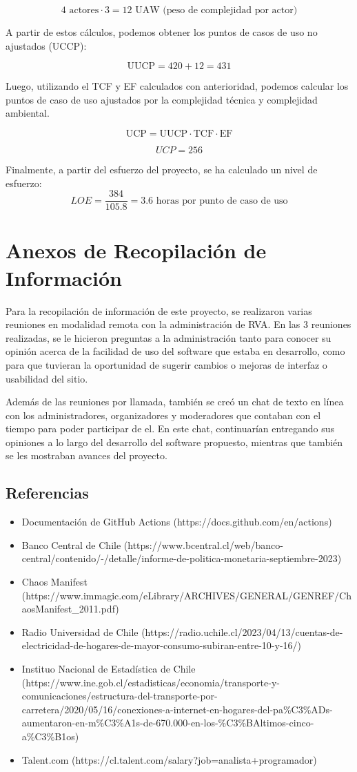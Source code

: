 \[
 4 \text{ actores} \cdot 3 = 12 \text{ UAW} \text{ (peso de complejidad por actor)}
\]

A partir de estos cálculos, podemos obtener los puntos de casos de uso no ajustados (UCCP):

\[
\text{UUCP} = 420 + 12 = 431
\]

Luego, utilizando el TCF y EF calculados con anterioridad, podemos calcular los puntos de caso de uso ajustados por la complejidad técnica y complejidad ambiental.

\[
\text{UCP} = \text{UUCP} \cdot \text{TCF} \cdot \text{EF}
\]

\[
UCP = 256
\]


Finalmente, a partir del esfuerzo del proyecto, se ha calculado un nivel de esfuerzo:
\[
LOE = \frac{384}{105.8} = 3.6 \text{ horas por punto de caso de uso}
\]

\section{Anexos de Recopilación de Información}
Para la recopilación de información de este proyecto, se realizaron varias reuniones en modalidad remota con la administración de RVA. En las 3 reuniones realizadas, se le hicieron preguntas a la administración tanto para conocer su opinión acerca de la facilidad de uso del software que estaba en desarrollo, como para que tuvieran la oportunidad de sugerir cambios o mejoras de interfaz o usabilidad del sitio.

Además de las reuniones por llamada, también se creó un chat de texto en línea con los administradores, organizadores y moderadores que contaban con el tiempo para poder participar de el. En este chat, continuarían entregando sus opiniones a lo largo del desarrollo del software propuesto, mientras que también se les mostraban avances del proyecto.

\subsection{Referencias}
\begin{itemize}
  \item Documentación de GitHub Actions (https://docs.github.com/en/actions)
  \item Banco Central de Chile (https://www.bcentral.cl/web/banco-central/contenido/-/detalle/informe-de-politica-monetaria-septiembre-2023)
  \item Chaos Manifest (https://www.immagic.com/eLibrary/ARCHIVES/GENERAL/GENREF/ChaosManifest\_2011.pdf)
  \item Radio Universidad de Chile (https://radio.uchile.cl/2023/04/13/cuentas-de-electricidad-de-hogares-de-mayor-consumo-subiran-entre-10-y-16/)
  \item Instituo Nacional de Estadística de Chile (https://www.ine.gob.cl/estadisticas/economia/transporte-y-comunicaciones/estructura-del-transporte-por-carretera/2020/05/16/conexiones-a-internet-en-hogares-del-pa\%C3\%ADs-aumentaron-en-m\%C3\%A1s-de-670.000-en-los-\%C3\%BAltimos-cinco-a\%C3\%B1os)
  \item Talent.com (https://cl.talent.com/salary?job=analista+programador)
\end{itemize}

